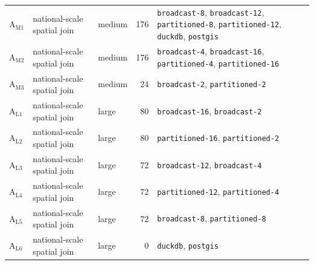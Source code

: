 \begin{longtable}{@{}l >{\raggedright\arraybackslash}p{} l r >{\raggedright\arraybackslash}p{}@{}}
	\addlinespace
	$\mathrm{A}_{\mathrm{M1}}$ & national-scale spatial join & medium & \num{176} & \texttt{broadcast-8}, \texttt{broadcast-12}, \texttt{partitioned-8}, \texttt{partitioned-12}, \texttt{duckdb}, \texttt{postgis} \\
	\addlinespace
	$\mathrm{A}_{\mathrm{M2}}$ & national-scale spatial join & medium & \num{176} & \texttt{broadcast-4}, \texttt{broadcast-16}, \texttt{partitioned-4}, \texttt{partitioned-16} \\
	\addlinespace
	$\mathrm{A}_{\mathrm{M3}}$ & national-scale spatial join & medium & \num{24} & \texttt{broadcast-2}, \texttt{partitioned-2} \\
	\addlinespace
	$\mathrm{A}_{\mathrm{L1}}$ & national-scale spatial join & large & \num{80} & \texttt{broadcast-16}, \texttt{broadcast-2} \\
	\addlinespace
	$\mathrm{A}_{\mathrm{L2}}$ & national-scale spatial join & large & \num{80} & \texttt{partitioned-16}, \texttt{partitioned-2} \\
	\addlinespace
	$\mathrm{A}_{\mathrm{L3}}$ & national-scale spatial join & large & \num{72} & \texttt{broadcast-12}, \texttt{broadcast-4} \\
	\addlinespace
	$\mathrm{A}_{\mathrm{L4}}$ & national-scale spatial join & large & \num{72} & \texttt{partitioned-12}, \texttt{partitioned-4} \\
	\addlinespace
	$\mathrm{A}_{\mathrm{L5}}$ & national-scale spatial join & large & \num{72} & \texttt{broadcast-8}, \texttt{partitioned-8} \\
	\addlinespace
	$\mathrm{A}_{\mathrm{L6}}$ & national-scale spatial join & large & \num{0} & \texttt{duckdb}, \texttt{postgis} \\
\end{longtable}
\endgroup